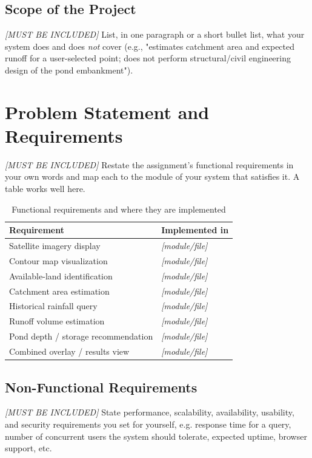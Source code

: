 \documentclass[manuscript,screen,review]{acmart}
\begin{document}
\subsection{Scope of the Project}
\textit{[MUST BE INCLUDED]} List, in one paragraph or a short bullet list, what
your system does and does \emph{not} cover (e.g., "estimates catchment
area and expected runoff for a user-selected point; does not perform
structural/civil engineering design of the pond embankment").

\section{Problem Statement and Requirements}
\label{sec:requirements}
\textit{[MUST BE INCLUDED]} Restate the assignment's functional requirements in
your own words and map each to the module of your system that
satisfies it. A table works well here.

\begin{table}[h]
  \caption{Functional requirements and where they are implemented}
  \label{tab:requirements}
  \begin{tabular}{p{3.6cm}p{3.6cm}}
    \toprule
    Requirement & Implemented in \\
    \midrule
    Satellite imagery display & \textit{[module/file]} \\
    Contour map visualization & \textit{[module/file]} \\
    Available-land identification & \textit{[module/file]} \\
    Catchment area estimation & \textit{[module/file]} \\
    Historical rainfall query & \textit{[module/file]} \\
    Runoff volume estimation & \textit{[module/file]} \\
    Pond depth / storage recommendation & \textit{[module/file]} \\
    Combined overlay / results view & \textit{[module/file]} \\
    \bottomrule
  \end{tabular}
\end{table}

\subsection{Non-Functional Requirements}
\textit{[MUST BE INCLUDED]} State performance, scalability, availability,
usability, and security requirements you set for yourself, e.g.
response time for a query, number of concurrent users the system
should tolerate, expected uptime, browser support, etc.
\end{document}
